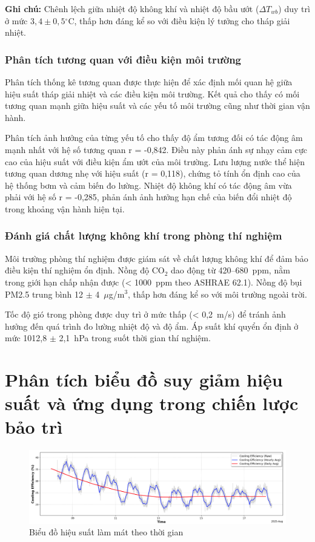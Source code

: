 \documentclass[../main.tex]{subfiles}
\begin{document}
\textbf{Ghi chú:} Chênh lệch giữa nhiệt độ không khí và nhiệt độ bầu ướt ($\Delta T_{wb}$) duy trì ở mức $3,4 \pm 0,5{^\circ\mathrm{C}}$, thấp hơn đáng kể so với điều kiện lý tưởng cho tháp giải nhiệt.

\subsubsection{Phân tích tương quan với điều kiện môi trường}
\label{sec:environmental_correlation}

Phân tích thống kê tương quan được thực hiện để xác định mối quan hệ giữa hiệu suất tháp giải nhiệt và các điều kiện môi trường. Kết quả cho thấy có mối tương quan mạnh giữa hiệu suất và các yếu tố môi trường cũng như thời gian vận hành.

Phân tích ảnh hưởng của từng yếu tố cho thấy độ ẩm tương đối có tác động âm mạnh nhất với hệ số tương quan r = -0,842. Điều này phản ánh sự nhạy cảm cực cao của hiệu suất với điều kiện ẩm ướt của môi trường. Lưu lượng nước thể hiện tương quan dương nhẹ với hiệu suất (r = 0,118), chứng tỏ tính ổn định cao của hệ thống bơm và cảm biến đo lường. Nhiệt độ không khí có tác động âm vừa phải với hệ số r = -0,285, phản ánh ảnh hưởng hạn chế của biến đổi nhiệt độ trong khoảng vận hành hiện tại.

\subsubsection{Đánh giá chất lượng không khí trong phòng thí nghiệm}
\label{sec:indoor_air_quality}

Môi trường phòng thí nghiệm được giám sát về chất lượng không khí để đảm bảo điều kiện thí nghiệm ổn định. Nồng độ CO$_2$ dao động từ 420--680~ppm, nằm trong giới hạn chấp nhận được (< 1000~ppm theo ASHRAE 62.1). Nồng độ bụi PM2.5 trung bình 12 $\pm$ 4~$\mu$g/m$^3$, thấp hơn đáng kể so với môi trường ngoài trời.

Tốc độ gió trong phòng được duy trì ở mức thấp (< 0,2~m/s) để tránh ảnh hưởng đến quá trình đo lường nhiệt độ và độ ẩm. Áp suất khí quyển ổn định ở mức 1012,8 $\pm$ 2,1~hPa trong suốt thời gian thí nghiệm.

\section{Phân tích biểu đồ suy giảm hiệu suất và ứng dụng trong chiến lược bảo trì}
\label{sec:performance_degradation_analysis}

\begin{figure}[H]
    \centering
    \includegraphics[width=1\textwidth]{../Hinhve/bieu_do_hieu_suat.png}
    \caption{Biểu đồ hiệu suất làm mát theo thời gian}
    \label{fig:cooling_efficiency_chart}
\end{figure}
\end{document}

